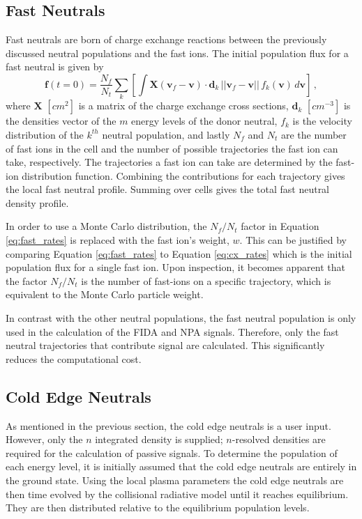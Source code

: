 \subsection{Fast Neutrals}
Fast neutrals are born of charge exchange reactions between the previously discussed neutral populations and the fast ions. 
The initial population flux for a fast neutral is given by
\begin{equation}\label{eq:fast_rates}
    \mathbf{f}(t=0) = \frac{N_f}{N_{t}}\sum_k \left [ \int \mathbf{X}(\mathbf{v}_f - \mathbf{v}) \cdot \mathbf{d}_k\, ||\mathbf{v}_f - \mathbf{v}||\, f_k(\mathbf{v})\, d\mathbf{v} \right ]\,,
\end{equation}
where $\mathbf{X}$ $[cm^2]$ is a matrix of the charge exchange cross sections, $\mathbf{d}_k$ $[cm^{-3}]$ is the densities vector of the $m$ energy levels of the donor neutral, $f_k$ is the velocity distribution of the $k^{th}$ neutral population, and lastly $N_f$ and $N_t$ are the number of fast ions in the cell and the number of possible trajectories the fast ion can take, respectively. The trajectories a fast ion can take are determined by the fast-ion distribution function. Combining the contributions for each trajectory gives the local fast neutral profile. Summing over cells gives the total fast neutral density profile.

In order to use a Monte Carlo distribution, the $N_f/N_t$ factor in Equation \ref{eq:fast_rates} is replaced with the fast ion's weight, $w$. This can be justified by comparing Equation \ref{eq:fast_rates} to Equation \ref{eq:cx_rates} which is the initial population flux for a single fast ion. Upon inspection, it becomes apparent that the factor $N_f/N_t$ is the number of fast-ions on a specific trajectory, which is equivalent to the Monte Carlo particle weight.

In contrast with the other neutral populations, the fast neutral population is only used in the calculation of the FIDA and NPA signals. Therefore, only the fast neutral trajectories that contribute signal are calculated. This significantly reduces the computational cost.

\subsection{Cold Edge Neutrals}
As mentioned in the previous section, the cold edge neutrals is a user input. However, only the $n$ integrated density is supplied; $n$-resolved densities are required for the calculation of passive signals. To determine the population of each energy level, it is initially assumed that the cold edge neutrals are entirely in the ground state. Using the local plasma parameters the cold edge neutrals are then time evolved by the collisional radiative model until it reaches equilibrium. They are then distributed relative to the equilibrium population levels.

